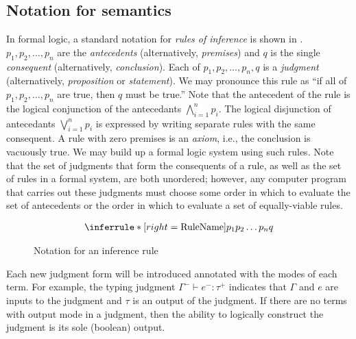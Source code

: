\subsection{Notation for semantics}
\label{sec:semantics-notation}
In formal logic, a standard notation for \textit{rules of inference} is shown in . $p_1,p_2,\dots,p_n$ are the \textit{antecedents} (alternatively, \textit{premises}) and $q$ is the single \textit{consequent} (alternatively, \textit{conclusion}). Each of $p_1,p_2,\dots,p_n,q$ is a \textit{judgment} (alternatively, \textit{proposition} or \textit{statement}). We may pronounce this rule as ``if all of $p_1,p_2,\dots,p_n$ are true, then $q$ must be true.'' Note that the antecedent of the rule is the logical conjunction of the antecedants $\bigwedge_{i=1}^n p_i$. The logical disjunction of antecedants $\bigvee_{i=1}^n p_i$ is expressed by writing separate rules with the same consequent. A rule with zero premises is an \textit{axiom}, i.e., the conclusion is vacuously true. We may build up a formal logic system using such rules. Note that the set of judgments that form the consequents of a rule, as well as the set of rules in a formal system, are both unordered; however, any computer program that carries out these judgments must choose some order in which to evaluate the set of antecedents or the order in which to evaluate a set of equally-viable rules.

\begin{figure}
  \centering
  \begin{mdframed}
    \begin{singlespace}
      \begin{equation*}
        \Infer{RuleName}{p_1 \\ p_2 \\ \dots \\ p_n}{q}
      \end{equation*}
    \end{singlespace}
  \end{mdframed}
  \caption{Notation for an inference rule}
  \label{fig:sample-inference-rule}
\end{figure}

Each new judgment form will be introduced annotated with the modes of each term. For example, the typing judgment $\Gamma^-\vdash e^-:\tau^+$ indicates that $\Gamma$ and $e$ are inputs to the judgment and $\tau$ is an output of the judgment. If there are no terms with output mode in a judgment, then the ability to logically construct the judgment is its sole (boolean) output.

